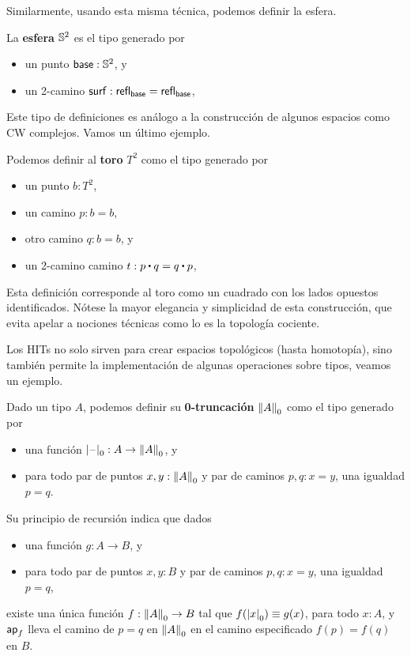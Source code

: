 \documentclass[../main.tex]{subfiles}
\begin{document}
Similarmente, usando esta misma t\'ecnica, podemos definir la esfera.
\begin{definition}
  La \textbf{esfera} $\Sn^2$ es el tipo generado por
  \begin{itemize}
    \item un punto $\base : \Sn^2$, y
    \item un 2-camino $\mathsf{surf} : \refl{\base}=\refl{\base}$,
  \end{itemize}
\end{definition}

Este tipo de definiciones es an\'alogo a la construcci\'on de algunos espacios como CW complejos. Vamos un \'ultimo ejemplo.
\begin{definition}
  Podemos definir al \textbf{toro} $T^2$ como el tipo generado por
  \begin{itemize}
    \item un punto $b : T^2$,
    \item un camino $p:b=b$,
    \item otro camino $q:b=b$, y
    \item un 2-camino camino $t:p\ct q= q \ct p$,
  \end{itemize}
\end{definition}
Esta definici\'on corresponde al toro como un cuadrado con los lados opuestos identificados. N\'otese la mayor elegancia y simplicidad de esta construcci\'on, que evita apelar a nociones t\'ecnicas como lo es la topolog\'ia cociente.

Los HITs no solo sirven para crear espacios topol\'ogicos (hasta homotop\'ia), sino tambi\'en permite la implementaci\'on de algunas operaciones sobre tipos, veamos un ejemplo.

\begin{definition}
  Dado un tipo $A$, podemos definir su \textbf{0-truncaci\'on} $\trunc0 A$ como el tipo generado por
  \begin{itemize}
    \item una funci\'on $\tprojf0 : A \to \trunc0 A$, y
    \item para todo par de puntos $x,y:\trunc0A$ y par de caminos $p,q:x=y$, una igualdad $p=q$.
  \end{itemize}
  Su principio de recursi\'on indica que dados
  \begin{itemize}
    \item una funci\'on $g: A \to B$, y
    \item para todo par de puntos $x,y:B$ y par de caminos $p,q:x=y$, una igualdad $p=q$,
  \end{itemize}
  existe una \'unica funci\'on $f: \trunc0 A \to B$ tal que $f(\tproj0x) \jdeq g(x)$, para todo $x:A$, y $\apfunc{f}$ lleva el camino de $p=q$ en $\trunc0 A$ en el camino especificado $f(p)=f(q)$ en $B$.
\end{definition}
\end{document}
